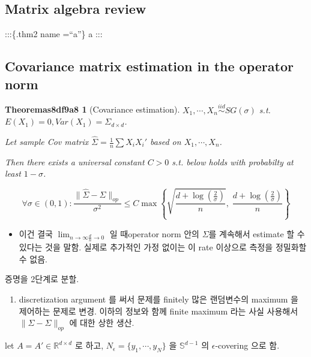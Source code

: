\documentclass[
]{book}
\providecommand{\tightlist}{%
  \setlength{\itemsep}{0pt}\setlength{\parskip}{0pt}}
\newtheorem{theorem}{Theoremas8df9a8}[section]
\begin{document}
{{{\hypertarget{matrix-algebra-review}{%
\subsection{Matrix algebra review}\label{matrix-algebra-review}}

:::\{.thm2 name =``a''\}
a
:::

\hypertarget{covariance-matrix-estimation-in-the-operator-norm}{%
\subsection{Covariance matrix estimation in the operator norm}\label{covariance-matrix-estimation-in-the-operator-norm}}

\begin{theorem}[Covariance estimation]
\(X_1 , \cdots, X_n \overset {iid}\sim SG(\sigma)\) s.t. \(E(X_1) = 0, Var(X_1) = \Sigma_{d \times d}\).

Let sample Cov matrix \(\hat \Sigma = \frac{1}{n} \sum X_i X_i '\) based on \(X_1 , \cdots, X_n\).

Then there exists a universal constant \(C >0\) s.t. below holds with probabilty at least \(1-\sigma\).

\[
\forall \sigma \in (0,1): \frac{\|\hat \Sigma - \Sigma \|_{op}}{\sigma^2} \le C \max \left \{ \sqrt{\frac{d + \log(\frac{2}{\sigma})}{n}}, \; {\frac{d + \log(\frac{2}{\sigma})}{n}}\right \}
\]
\end{theorem}

\begin{itemize}
\tightlist
\item
  이건 결국 \(\lim_{n \rightarrow \infty \frac{d}{n} \rightarrow 0}\) 일 때operator norm 안의 \(\Sigma\)를 계속해서 estimate 할 수 있다는 것을 말함. 실제로 추가적인 가정 없이는 이 rate 이상으로 측정을 정밀화할 수 없음.
\end{itemize}

증명을 2단계로 분할.

\begin{enumerate}
\def\labelenumi{\arabic{enumi}.}
\tightlist
\item
  discretization argument 를 써서 문제를 finitely 많은 랜덤변수의 maximum 을 제어하는 문제로 변경. 이하의 정보와 함께 finite maximum 라는 사실 사용해서 \(\|\hat \Sigma - \Sigma \|_{op}\) 에 대한 상한 생산.
\end{enumerate}

let \(A = A' \in \mathbb R^{d \times d}\) 로 하고, \(N_\epsilon = \{ y_1 , \cdots, y_N \}\) 을 \(\mathbb S^{d-1}\) 의 \(\epsilon\)-covering 으로 함.

}}}
\end{document}
